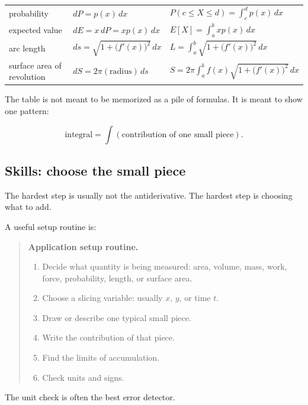 \begin{center}
\begin{tabular}{p{}|p{}|p{}}
probability &
\(\displaystyle dP=p(x)\,dx\) &
\(\displaystyle P(c\le X\le d)=\int_c^d p(x)\,dx\) \\

expected value &
\(\displaystyle dE=x\,dP=xp(x)\,dx\) &
\(\displaystyle E[X]=\int_a^b xp(x)\,dx\) \\

arc length &
\(\displaystyle ds=\sqrt{1+\bigl(f'(x)\bigr)^2}\,dx\) &
\(\displaystyle L=\int_a^b \sqrt{1+\bigl(f'(x)\bigr)^2}\,dx\) \\

surface area of revolution &
\(\displaystyle dS=2\pi(\text{radius})\,ds\) &
\(\displaystyle S=2\pi\int_a^b f(x)\sqrt{1+\bigl(f'(x)\bigr)^2}\,dx\)
\end{tabular}
\end{center}

The table is not meant to be memorized as a pile of formulas.  It is meant to show one
pattern:

\[
\boxed{
\text{integral}=\int(\text{contribution of one small piece}).
}
\]

\subsection{Skills: choose the small piece}
\label{subsec:skills-choose-small-piece}

The hardest step is usually not the antiderivative.  The hardest step is choosing what to
add.

A useful setup routine is:

\begin{quote}
\textbf{Application setup routine.}

\begin{enumerate}
\item Decide what quantity is being measured: area, volume, mass, work, force,
probability, length, or surface area.
\item Choose a slicing variable: usually \(x\), \(y\), or time \(t\).
\item Draw or describe one typical small piece.
\item Write the contribution of that piece.
\item Find the limits of accumulation.
\item Check units and signs.
\end{enumerate}
\end{quote}

The unit check is often the best error detector.

